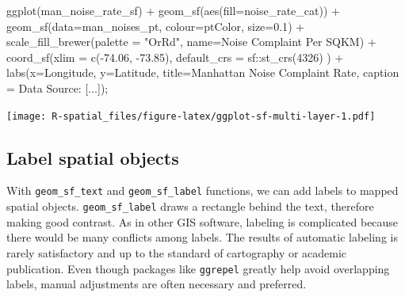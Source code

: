 \documentclass[
  11pt,
]{book}
\newenvironment{Shaded}{\begin{snugshade}}{\end{snugshade}}
\newcommand{\AttributeTok}[1]{\textcolor[rgb]{0.77,0.63,0.00}{#1}}
\newcommand{\DecValTok}[1]{\textcolor[rgb]{0.00,0.00,0.81}{#1}}
\newcommand{\FloatTok}[1]{\textcolor[rgb]{0.00,0.00,0.81}{#1}}
\newcommand{\FunctionTok}[1]{\textcolor[rgb]{0.00,0.00,0.00}{#1}}
\newcommand{\NormalTok}[1]{#1}
\newcommand{\SpecialCharTok}[1]{\textcolor[rgb]{0.00,0.00,0.00}{#1}}
\newcommand{\StringTok}[1]{\textcolor[rgb]{0.31,0.60,0.02}{#1}}
\begin{document}
\begin{Shaded}
\begin{Highlighting}[]
\FunctionTok{ggplot}\NormalTok{(man\_noise\_rate\_sf) }\SpecialCharTok{+} 
  \FunctionTok{geom\_sf}\NormalTok{(}\FunctionTok{aes}\NormalTok{(}\AttributeTok{fill=}\NormalTok{noise\_rate\_cat)) }\SpecialCharTok{+}
  \FunctionTok{geom\_sf}\NormalTok{(}\AttributeTok{data=}\NormalTok{man\_noises\_pt, }\AttributeTok{colour=}\NormalTok{ptColor, }\AttributeTok{size=}\FloatTok{0.1}\NormalTok{) }\SpecialCharTok{+}
  \FunctionTok{scale\_fill\_brewer}\NormalTok{(}\AttributeTok{palette =} \StringTok{"OrRd"}\NormalTok{, }\AttributeTok{name=}\StringTok{\textquotesingle{}Noise Complaint Per SQKM\textquotesingle{}}\NormalTok{) }\SpecialCharTok{+}
  \FunctionTok{coord\_sf}\NormalTok{(}\AttributeTok{xlim =} \FunctionTok{c}\NormalTok{(}\SpecialCharTok{{-}}\FloatTok{74.06}\NormalTok{, }\SpecialCharTok{{-}}\FloatTok{73.85}\NormalTok{), }\AttributeTok{default\_crs =}\NormalTok{ sf}\SpecialCharTok{::}\FunctionTok{st\_crs}\NormalTok{(}\DecValTok{4326}\NormalTok{) ) }\SpecialCharTok{+}
  \FunctionTok{labs}\NormalTok{(}\AttributeTok{x=}\StringTok{\textquotesingle{}Longitude\textquotesingle{}}\NormalTok{, }\AttributeTok{y=}\StringTok{\textquotesingle{}Latitude\textquotesingle{}}\NormalTok{, }
       \AttributeTok{title=}\StringTok{\textquotesingle{}Manhattan Noise Complaint Rate\textquotesingle{}}\NormalTok{,}
       \AttributeTok{caption =} \StringTok{\textquotesingle{}Data Source: [...]\textquotesingle{}}\NormalTok{);}
\end{Highlighting}
\end{Shaded}

\texttt{[image: R-spatial\_files/figure-latex/ggplot-sf-multi-layer-1.pdf]}

\hypertarget{label-spatial-objects}{%
\subsection{Label spatial objects}\label{label-spatial-objects}}

With \texttt{geom\_sf\_text} and \texttt{geom\_sf\_label} functions, we can add labels to mapped spatial objects. \texttt{geom\_sf\_label} draws a rectangle behind the text, therefore making good contrast. As in other GIS software, labeling is complicated because there would be many conflicts among labels. The results of automatic labeling is rarely satisfactory and up to the standard of cartography or academic publication. Even though packages like \texttt{ggrepel} greatly help avoid overlapping labels, manual adjustments are often necessary and preferred.
\end{document}
